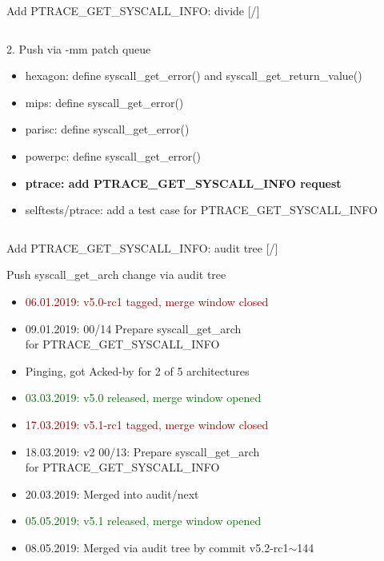 \documentclass[unicode,aspectratio=169,xcolor={table,dvipsnames,usernames}]{beamer}
\begin{document}
\begin{frame}[fragile]{Add PTRACE\_GET\_SYSCALL\_INFO: divide \hfill [\insertframenumber/\inserttotalframenumber]}
\begin{columns}
\begin{block}{2. Push via -mm patch queue}
\begin{itemize}
		\item hexagon: define syscall\_get\_error() and syscall\_get\_return\_value()
		\item mips: define syscall\_get\_error()
		\item parisc: define syscall\_get\_error()
		\item powerpc: define syscall\_get\_error()
		\item \textbf{ptrace: add PTRACE\_GET\_SYSCALL\_INFO request}
		\item selftests/ptrace: add a test case for PTRACE\_GET\_SYSCALL\_INFO
	\end{itemize}
		\end{block}
\end{columns}
\end{frame}

\begin{frame}{Add PTRACE\_GET\_SYSCALL\_INFO: audit tree \hfill [\insertframenumber/\inserttotalframenumber]}
\begin{block}{\Large Push syscall\_get\_arch change via audit tree}
\begin{itemize}
	\item \textcolor{darkred}{06.01.2019: v5.0-rc1 tagged, merge window closed}
	\item 09.01.2019: 00/14 Prepare syscall\_get\_arch \\ for PTRACE\_GET\_SYSCALL\_INFO
	\item Pinging, got Acked-by for 2 of 5 architectures
	\item \textcolor{darkgreen}{03.03.2019: v5.0 released, merge window opened}
	\item \textcolor{darkred}{17.03.2019: v5.1-rc1 tagged, merge window closed}
	\item 18.03.2019: v2 00/13: Prepare syscall\_get\_arch \\ for PTRACE\_GET\_SYSCALL\_INFO
	\item 20.03.2019: Merged into audit/next
	\item \textcolor{darkgreen}{05.05.2019: v5.1 released, merge window opened}
	\item 08.05.2019: Merged via audit tree by commit v5.2-rc1$\sim$144
\end{itemize}
\end{block}
\end{frame}
\end{document}
